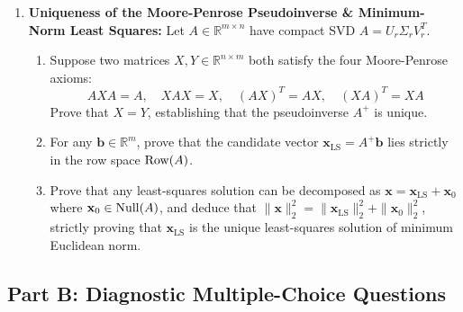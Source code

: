 \begin{enumerate}[label=\textbf{P\arabic*.}]
    \item \textbf{Uniqueness of the Moore-Penrose Pseudoinverse \& Minimum-Norm Least Squares:}
    Let $A \in \mathbb{R}^{m \times n}$ have compact SVD $A = U_r \Sigma_r V_r^T$.
    \begin{enumerate}[label=(\alph*)]
        \item Suppose two matrices $X, Y \in \mathbb{R}^{n \times m}$ both satisfy the four Moore-Penrose axioms:
        \begin{equation*}
        A X A = A, \quad X A X = X, \quad (A X)^T = A X, \quad (X A)^T = X A
        \end{equation*}
        Prove that $X = Y$, establishing that the pseudoinverse $A^+$ is unique.
        \item For any $\mathbf{b} \in \mathbb{R}^m$, prove that the candidate vector $\mathbf{x}_{\text{LS}} = A^+ \mathbf{b}$ lies strictly in the row space $\operatorname{Row}(A)$.
        \item Prove that any least-squares solution can be decomposed as $\mathbf{x} = \mathbf{x}_{\text{LS}} + \mathbf{x}_0$ where $\mathbf{x}_0 \in \operatorname{Null}(A)$, and deduce that $\|\mathbf{x}\|_2^2 = \|\mathbf{x}_{\text{LS}}\|_2^2 + \|\mathbf{x}_0\|_2^2$, strictly proving that $\mathbf{x}_{\text{LS}}$ is the unique least-squares solution of minimum Euclidean norm.
    \end{enumerate}
\end{enumerate}

\subsection*{Part B: Diagnostic Multiple-Choice Questions}

